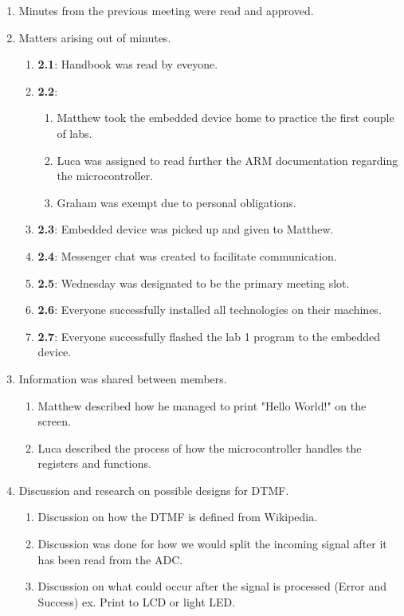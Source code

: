 \documentclass{cce2014-meetings}
\begin{document}
\begin{enumerate}

\item Minutes from the previous meeting were read and approved.

\item Matters arising out of minutes.
   \begin{enumerate}
      \item \textbf{2.1}: Handbook was read by eveyone.
      \item \textbf{2.2}:
      \begin{enumerate}
         \item Matthew took the embedded device home to practice the first couple of labs.
         \item Luca was assigned to read further the ARM documentation regarding the microcontroller.
         \item Graham was exempt due to personal obligations.
      \end{enumerate}
      \item \textbf{2.3}: Embedded device was picked up and given to Matthew.
      \item \textbf{2.4}: Messenger chat was created to facilitate communication.
      \item \textbf{2.5}: Wednesday was designated to be the primary meeting slot.
      \item \textbf{2.6}: Everyone successfully installed all technologies on their machines.
      \item \textbf{2.7}: Everyone successfully flashed the lab 1 program to the embedded device.
   \end{enumerate}

\item Information was shared between members.
   \begin{enumerate}
   \item Matthew described how he managed to print "Hello World!" on the screen.
   \item Luca described the process of how the microcontroller handles the registers and functions.
   \end{enumerate}

\item Discussion and research on possible designs for DTMF.
   \begin{enumerate}
      \item Discussion on how the DTMF is defined from Wikipedia.
      \item Discussion was done for how we would split the incoming signal after it has been read from the ADC.
      \item Discussion on what could occur after the signal is processed (Error and Success) ex. Print to LCD or light LED.
   \end{enumerate}
   

\end{enumerate}
\end{document}
